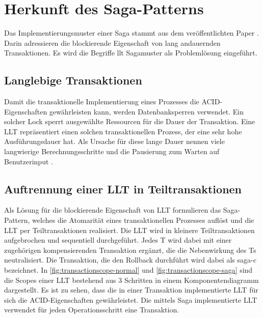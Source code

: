 \section{Herkunft des Saga-Patterns}\label{sec:section-garcia-paper}

Das Implementierungsmuster einer Saga stammt aus dem \citeyear{GarciaMolina.1987} veröffentlichten Paper . Darin adressieren \citeauthor{GarciaMolina.1987} die blockierende Eigenschaft von lang andauernden Transaktionen. Es wird die Begriffe \acrfull{llt} Sagamuster als Problemlösung eingeführt\cite{GarciaMolina.1987}. 

\subsection{Langlebige Transaktionen}
Damit die transaktionelle Implementierung eines Prozesses die ACID-Eigenschaften gewährleisten kann, werden Datenbanksperren verwendet. Ein solcher Lock sperrt ausgewählte Ressourcen für die Dauer der Transaktion. Eine LLT repräsentiert einen solchen transaktionellen Prozess, der eine sehr hohe Ausführungsdauer hat. Als Ursache für diese lange Dauer nennen \citeauthor{GarciaMolina.1987} viele langwierige Berechnungsschritte und die Pausierung zum Warten auf Benutzerinput \cite{GarciaMolina.1987}. 

\subsection{Auftrennung einer LLT in Teiltransaktionen}
Als Lösung für die blockierende Eigenschaft von LLT formulieren \citeauthor{GarciaMolina.1987} das Saga-Pattern, welches die Atomarität eines transaktionellen Prozesses auflöst und die LLT per Teiltransaktionen realisiert. Die LLT wird in kleinere Teiltransaktionen aufgebrochen und sequentiell durchgeführt. Jedes T wird dabei mit einer zugehörigen kompensierenden Transaktion ergänzt, die die Nebenwirkung des Ts neutralisiert. Die Transaktion, die den Rollback durchführt wird dabei als \acrfull{saga-c} bezeichnet. In \cref{fig:transactionscope-normal} und \cref{fig:transactionscope-saga} sind die Scopes einer LLT bestehend aus 3 Schritten in einem Komponentendiagramm dargestellt. Es ist zu sehen, dass die in einer Transaktion implementierte LLT für sich die ACID-Eigenschaften gewährleistet. Die mittels Saga implementierte LLT verwendet für jeden Operationsschritt eine Transaktion.

